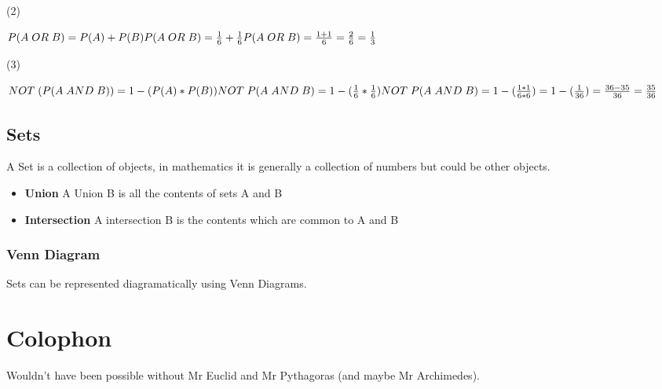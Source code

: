 \documentclass{article}
\begin{document}
(2)

$\\P(A\;OR\;B) = P(A) + P(B) \\
P(A\;OR\;B) = \frac{1}{6} + \frac{1}{6} \\
P(A\;OR\;B) = \frac{1 + 1}{6} = \frac{2}{6} = \frac{1}{3}
\\$

(3)

$\\NOT\;(P(A\;AND\;B)) = 1 - (P(A) * P(B)) \\
NOT \;P(A\;AND\;B) = 1 - (\frac{1}{6} * \frac{1}{6}) \\
NOT \; P(A\;AND\;B) = 1 -(\frac{1 * 1}{6 * 6}) = 1 - (\frac{1}{36}) = \frac{36-35}{36} = \frac{35}{36}
\\$

\newpage
\subsection{Sets}
A Set is a collection of objects, in mathematics it is generally a collection of numbers but could be other objects.
\begin{itemize}
\item \textbf{Union} A Union B is all the contents of sets A and B
\item \textbf{Intersection} A intersection B is the contents which are common to A and B 
\end{itemize}
\subsubsection{Venn Diagram}
Sets can be represented diagramatically using Venn Diagrams.
\begin{center}
\end{center}

\newpage
\section{Colophon}

Wouldn't have been possible without Mr Euclid and Mr Pythagoras (and maybe Mr Archimedes).
\end{document}
